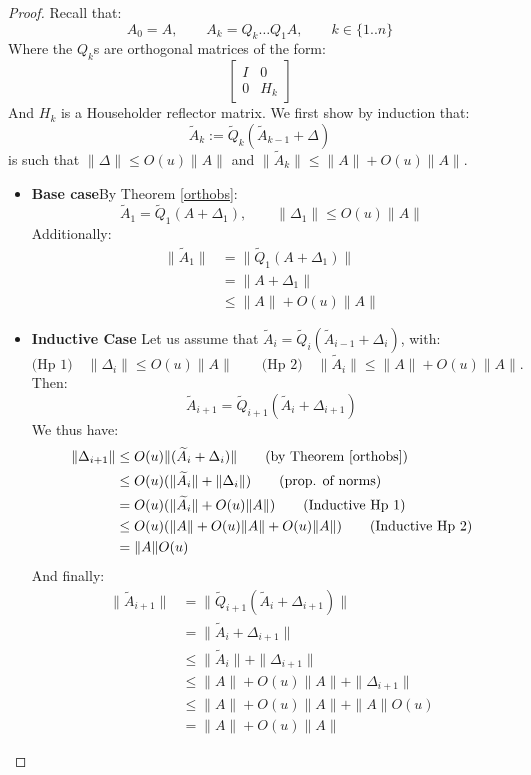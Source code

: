 \documentclass{article}
\begin{document}
\begin{proof}
 Recall that:
 \[ A_0 = A,\quad\quad A_{k} = Q_k\hdots Q_1 A,
 \quad\quad k \in \{1..n\}\]
Where the $Q_k$s are orthogonal matrices of the form:
\[\begin{bmatrix}
   I & 0\\
   0 & H_k
  \end{bmatrix}
\]
And $H_k$ is a Householder reflector matrix. We first show by induction that:
\[ \widetilde A_k := \widetilde Q_k (\widetilde A_{k-1} + \Delta) \]
is such that $\|\Delta\| \leq O(u)\|A\|$ and $\|\widetilde A_k\| \leq \|A\| + O(u) \|A\|$.
\begin{itemize}
 \item \textbf{Base case}\quad By Theorem \ref{orthobs}:
 \[ \widetilde A_1 = \widetilde Q_1(A + \Delta_1), \quad\quad \|\Delta_1\| \leq O(u) \|A\|\]
 Additionally:
 \begin{align*}
  \|\widetilde A_1\| &= \|\widetilde Q_1 (A + \Delta_1)\|\\
  &=\|A + \Delta_1\| \tag{orthogonality}\\
  &\leq \|A\| + O(u) \|A\| \tag{prop. of norms, above ineq.}
 \end{align*}

 \item \textbf{Inductive Case} \quad Let us assume that $\widetilde A_{i} = \widetilde Q_i (\widetilde A_{i-1} + \Delta_i)$, with:
 \[ \text{(Hp 1)} \quad\|\Delta_i\| \leq O(u)\|A\| \quad\quad \text{(Hp 2)} \quad \|\tilde A_i\| \leq \|A\| + O(u) \|A\|.\]
 Then:
 \[ \widetilde A_{i+1} = \widetilde Q_{i + 1} (\widetilde A_i  + \Delta_{i+1}) \]
We thus have:
\begin{align*}
  \|\Delta_{i+1}\| &\leq O(u) \|(\widetilde A_i + \Delta_i)\|\tag{by Theorem \ref{orthobs}}\\
  &\leq O(u) (\|\widetilde A_i\| + \|\Delta_i\|) \tag{prop. of norms}\\
  &= O(u) (\|\widetilde A_i\| + O(u)\|A\|) \tag{Inductive Hp 1}\\
  &\leq O(u) (\|A\| + O(u) \|A\| + O(u) \|A\|) \tag{Inductive Hp 2}\\
  &= \|A\|O(u)
\end{align*}
And finally:
\begin{align*}
 \|\widetilde A_{i+1}\| &= \|\widetilde Q_{i + 1} (\widetilde A_i  + \Delta_{i+1})\|\\
&=   \|\widetilde A_i  + \Delta_{i+1}\| \tag{Orthogonality}\\
  &\leq \|\widetilde A_{i}\| + \|\Delta_{i+1}\| \tag{prop. of norms}\\
  &\leq \|A\| + O(u)\|A\| + \|\Delta_{i+1}\| \tag{Inductive Hp 2}\\
  &\leq \|A\| + O(u)\|A\| + \|A\|O(u) \tag{above inequality}\\
  & = \|A\| + O(u) \|A\|
\end{align*}


\end{itemize}
\end{proof}
\end{document}
